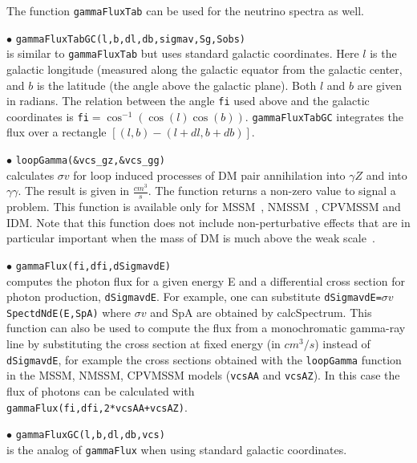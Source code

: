\documentclass[12pt,a4paper]{article}
\begin{document}
The function \verb|gammaFluxTab| can be used  for the neutrino spectra as well.

\noindent
$\bullet$ \verb|gammaFluxTabGC(l,b,dl,db,sigmav,Sg,Sobs)|\\
is similar to {\tt gammaFluxTab}  but uses standard galactic
coordinates. Here $l$ is  the galactic longitude (measured along the galactic   
equator from the galactic center, and $b$ is the latitude (the angle above the galactic    
plane). Both $l$ and $b$ are given in radians. The relation between the angle {\tt fi} used
above and the galactic coordinates is  {\tt fi}$=\cos^{-1}(\cos(l)\cos(b))$.  
 {\tt gammaFluxTabGC} integrates the flux over a     
rectangle $[(l,b) - (l+dl,b+db)]$. 


\noi$\bullet$ \verb|loopGamma(&vcs_gz,&vcs_gg)|\\
calculates $\sigma v$ for  loop induced processes of DM pair
annihilation into $\gamma Z$ and into $\gamma \gamma$. The result is given in  
$\frac{cm^3}{s}$. The function returns a non-zero value to signal a problem. 
This function is  available only for MSSM~\cite{Boudjema:2005hb}, NMSSM~\cite{Chalons:2011ia}, CPVMSSM and  IDM. 
Note that this function does not include non-perturbative effects that are in particular  important when the mass of DM is much above the weak scale~\cite{Hisano:2004ds,Hryczuk:2011vi}.




\noindent
$\bullet$ \verb|gammaFlux(fi,dfi,dSigmavdE)|\\
computes the photon flux for a given energy E and a differential cross section for photon production, \verb|dSigmavdE|. 
For example, one can substitute \verb|dSigmavdE=|$\sigma v$\verb|SpectdNdE(E,SpA)|
where $\sigma v$ and SpA are obtained by calcSpectrum. This function can also be used to compute the flux from a monochromatic gamma-ray line by substituting the cross section at fixed energy (in $cm^3/s$)  instead of \verb|dSigmavdE|, for example the cross sections obtained with the
\verb|loopGamma| function in  the   MSSM, NMSSM, CPVMSSM models (\verb|vcsAA| and \verb|vcsAZ|).
In this case the  flux of photons can be calculated with \\
\verb|gammaFlux(fi,dfi,2*vcsAA+vcsAZ)|.





\noindent
$\bullet$ \verb|gammaFluxGC(l,b,dl,db,vcs)|\\
is the analog of  \verb|gammaFlux| when using standard galactic coordinates.
\end{document}
